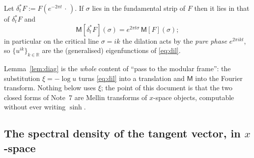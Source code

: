 \documentclass[11pt]{article}
\newcommand{\Mel}{\mathsf M}
\begin{document}
\begin{lemma}\label{lem:diag}
Let $\delta_t^*F:=F(e^{-2\pi t}\,\cdot\,)$.  If $\sigma$ lies in the fundamental strip of $F$ then it lies
in that of $\delta_t^*F$ and
\begin{equation}\label{eq:diag}
 \Mel[\delta_t^*F](\sigma)=e^{2\pi t\sigma}\,\Mel[F](\sigma);
\end{equation}
in particular on the critical line $\sigma=ik$ the dilation acts by the \emph{pure phase} $e^{2\pi ikt}$,
so $\{u^{ik}\}_{k\in\mathbb R}$ are the (generalised) eigenfunctions of \eqref{eq:dil}.
\end{lemma}
\lproof
{}

\begin{remark}
Lemma~\ref{lem:diag} is the \emph{whole} content of ``pass to the modular frame'': the substitution
$\xi=-\log u$ turns \eqref{eq:dil} into a translation and $\Mel$ into the Fourier transform.  Nothing
below uses $\xi$; the point of this document is that the two closed forms of Note~7 are Mellin
transforms of $x$-space objects, computable without ever writing $\sinh$.
\end{remark}

\subsection{The spectral density of the tangent vector, in $x$-space}\label{sec:parseval}
\end{document}
